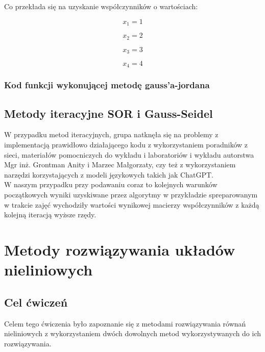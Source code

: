 \documentclass{article}
\begin{document}
Co przekłada się na uzyskanie współczynników o wartościach:
\begin{figure}[H]
    \begin{multicols}{4}
        \begin{equation*}
            x_1 = 1
        \end{equation*}
        \par
        \begin{equation*}
            x_2 = 2
        \end{equation*}
        \par
        \begin{equation*}
            x_3 = 3
        \end{equation*}
        \par
        \begin{equation*}
            x_4 = 4
        \end{equation*}
    \end{multicols}
\end{figure}
\subsubsection{Kod funkcji wykonującej metodę gauss'a-jordana}

\subsection{Metody iteracyjne SOR i Gauss-Seidel}
W przypadku metod iteracyjnych, grupa natknęła się na problemy z implementacją prawidłowo działającego kodu z wykorzystaniem poradników z sieci, materiałów pomocniczych do wykładu i laboratoriów i wykładu autorstwa Mgr inż. Grontman Anity i Marzec Małgorzaty, czy też z wykorzystaniem narzędzi korzystających z modeli językowych takich jak ChatGPT.\\
W naszym przypadku przy podawaniu coraz to kolejnych  warunków początkowych wyniki uzyskiwane przez algorytmy w przykładzie spreparowanym w trakcie zajęć wychodziły wartości wynikowej macierzy współczynników z każdą kolejną iteracją wyższe rzędy.
\section{Metody rozwiązywania układów nieliniowych}

\subsection{Cel ćwiczeń}
Celem tego ćwiczenia było zapoznanie się z metodami rozwiązywania równań nieliniowych z wykorzystaniem dwóch dowolnych metod wykorzystywanych do ich rozwiązywania.
\end{document}
